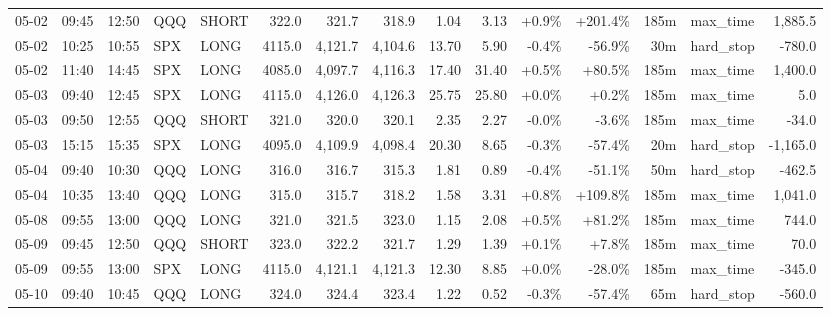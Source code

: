 \documentclass[11pt,a4paper,twoside]{article}
\begin{document}
\begin{landscape}
\begin{center}
\begin{longtable}{>{\color{txtmain}}l l l l l r r r r r r r r >{\color{txtmain}}l r}
05-02 & 09:45 & 12:50 & QQQ & SHORT & 322.0 & 321.7 & 318.9 & 1.04 & 3.13 & \textcolor{wingreen}{+0.9\%} & \textcolor{wingreen}{+201.4\%} & 185m & max\_time & \textcolor{wingreen}{1,885.5} \\
05-02 & 10:25 & 10:55 & SPX & LONG & 4115.0 & 4,121.7 & 4,104.6 & 13.70 & 5.90 & \textcolor{lossred}{-0.4\%} & \textcolor{lossred}{-56.9\%} & 30m & hard\_stop & \textcolor{lossred}{-780.0} \\
05-02 & 11:40 & 14:45 & SPX & LONG & 4085.0 & 4,097.7 & 4,116.3 & 17.40 & 31.40 & \textcolor{wingreen}{+0.5\%} & \textcolor{wingreen}{+80.5\%} & 185m & max\_time & \textcolor{wingreen}{1,400.0} \\
05-03 & 09:40 & 12:45 & SPX & LONG & 4115.0 & 4,126.0 & 4,126.3 & 25.75 & 25.80 & \textcolor{wingreen}{+0.0\%} & \textcolor{wingreen}{+0.2\%} & 185m & max\_time & \textcolor{wingreen}{5.0} \\
05-03 & 09:50 & 12:55 & QQQ & SHORT & 321.0 & 320.0 & 320.1 & 2.35 & 2.27 & \textcolor{lossred}{-0.0\%} & \textcolor{lossred}{-3.6\%} & 185m & max\_time & \textcolor{lossred}{-34.0} \\
05-03 & 15:15 & 15:35 & SPX & LONG & 4095.0 & 4,109.9 & 4,098.4 & 20.30 & 8.65 & \textcolor{lossred}{-0.3\%} & \textcolor{lossred}{-57.4\%} & 20m & hard\_stop & \textcolor{lossred}{-1,165.0} \\
05-04 & 09:40 & 10:30 & QQQ & LONG & 316.0 & 316.7 & 315.3 & 1.81 & 0.89 & \textcolor{lossred}{-0.4\%} & \textcolor{lossred}{-51.1\%} & 50m & hard\_stop & \textcolor{lossred}{-462.5} \\
05-04 & 10:35 & 13:40 & QQQ & LONG & 315.0 & 315.7 & 318.2 & 1.58 & 3.31 & \textcolor{wingreen}{+0.8\%} & \textcolor{wingreen}{+109.8\%} & 185m & max\_time & \textcolor{wingreen}{1,041.0} \\
05-08 & 09:55 & 13:00 & QQQ & LONG & 321.0 & 321.5 & 323.0 & 1.15 & 2.08 & \textcolor{wingreen}{+0.5\%} & \textcolor{wingreen}{+81.2\%} & 185m & max\_time & \textcolor{wingreen}{744.0} \\
05-09 & 09:45 & 12:50 & QQQ & SHORT & 323.0 & 322.2 & 321.7 & 1.29 & 1.39 & \textcolor{wingreen}{+0.1\%} & \textcolor{wingreen}{+7.8\%} & 185m & max\_time & \textcolor{wingreen}{70.0} \\
05-09 & 09:55 & 13:00 & SPX & LONG & 4115.0 & 4,121.1 & 4,121.3 & 12.30 & 8.85 & \textcolor{wingreen}{+0.0\%} & \textcolor{lossred}{-28.0\%} & 185m & max\_time & \textcolor{lossred}{-345.0} \\
05-10 & 09:40 & 10:45 & QQQ & LONG & 324.0 & 324.4 & 323.4 & 1.22 & 0.52 & \textcolor{lossred}{-0.3\%} & \textcolor{lossred}{-57.4\%} & 65m & hard\_stop & \textcolor{lossred}{-560.0} \\

\end{longtable}
\end{center}
\end{landscape}
\end{document}
